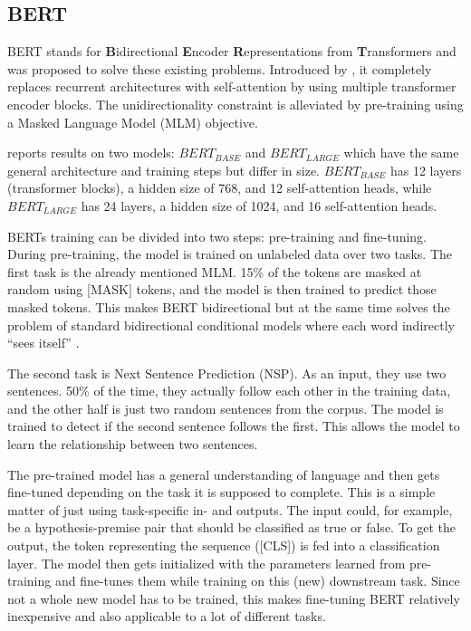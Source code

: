 \subsection{BERT} \label{bert}

BERT stands for \textbf{B}idirectional \textbf{E}ncoder \textbf{R}epresentations from \textbf{T}ransformers and was proposed to solve these existing problems. Introduced by \citet{devlin2018bert}, it completely replaces recurrent architectures with self-attention by using multiple transformer encoder blocks. The unidirectionality constraint is alleviated by pre-training using a Masked Language Model (MLM) objective.

\citet{devlin2018bert} reports results on two models: $BERT_{BASE}$ and $BERT_{LARGE}$ which have the same general architecture and training steps but differ in size. $BERT_{BASE}$ has 12 layers (transformer blocks), a hidden size of 768, and 12 self-attention heads, while $BERT_{LARGE}$ has 24 layers, a hidden size of 1024, and 16 self-attention heads.

BERTs training can be divided into two steps: pre-training and fine-tuning. During pre-training, the model is trained on unlabeled data over two tasks. The first task is the already mentioned MLM. 15\% of the tokens are masked at random using [MASK] tokens, and the model is then trained to predict those masked tokens. This makes BERT bidirectional but at the same time solves the problem of standard bidirectional conditional models where each word indirectly ``sees itself'' \citep{devlin2018bert}.

The second task is Next Sentence Prediction (NSP). As an input, they use two sentences. 50\% of the time, they actually follow each other in the training data, and the other half is just two random sentences from the corpus. The model is trained to detect if the second sentence follows the first. This allows the model to learn the relationship between two sentences.

The pre-trained model has a general understanding of language and then gets fine-tuned depending on the task it is supposed to complete. This is a simple matter of just using task-specific in- and outputs. The input could, for example, be a hypothesis-premise pair that should be classified as true or false. To get the output, the token representing the sequence ([CLS]) is fed into a classification layer. The model then gets initialized with the parameters learned from pre-training and fine-tunes them while training on this (new) downstream task. Since not a whole new model has to be trained, this makes fine-tuning BERT relatively inexpensive and also applicable to a lot of different tasks.

